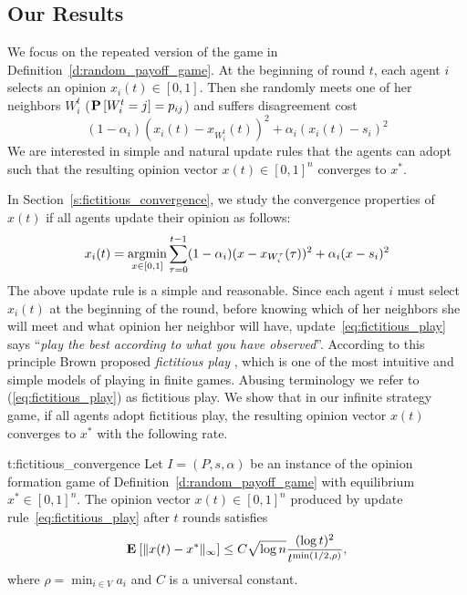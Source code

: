 \subsection{Our Results}

We focus on the repeated version of the game in 
Definition~\ref{d:random_payoff_game}. At the beginning 
of round $t$, each agent $i$ selects an opinion 
$x_i(t) \in [0,1]$. Then she randomly meets 
one of her neighbors $W_i^t$ ($\bm{\mathrm{P}}\left[W_i^t=j\right]=p_{ij}$)
and suffers disagreement cost
\[(1-\alpha_i)(x_i(t)-x_{W_i^t}(t))^2+\alpha_i(x_i(t)-s_i)^2 \] 
We are interested in simple and natural update rules
that the agents can adopt such that the resulting opinion
vector $x(t) \in [0,1]^n$ converges to $x^*$.

In Section~\ref{s:fictitious_convergence},
we study the convergence properties of $x(t)$ if all agents
update their opinion as follows:
\begin{equation}\label{eq:fictitious_play}
  x_i(t) =
  \operatorname*{argmin}_{x \in [0,1]}
  \sum_{\tau=0}^{t-1}(1-\alpha_i)(x-x_{W_i^\tau}(\tau))^2+\alpha_i(x-s_i)^2
\end{equation}
%
The above update rule is a simple and
reasonable. Since each agent $i$ must select $x_i(t)$ 
at the beginning of the round, before knowing 
which of her neighbors she will meet and 
what opinion her neighbor will have, 
update~\ref{eq:fictitious_play} says
\enquote{\emph{play the best according to what you have observed}}.
According to this principle Brown proposed \emph{fictitious play} 
\cite{Bro51}, which is one of the most intuitive and simple 
models of playing in finite games. Abusing terminology 
we refer to (\ref{eq:fictitious_play}) as fictitious play. 
We show that in our infinite strategy game, if all agents
adopt fictitious play, the resulting opinion vector $x(t)$ converges to
$x^*$ with the following rate.
%
\begin{reptheorem}{t:fictitious_convergence}
  Let $I = (P,s, \alpha)$ be an instance of the opinion formation
  game of Definition~\ref{d:random_payoff_game} with equilibrium
  $x^* \in [0,1]^n$.  The opinion vector $x(t)\in[0,1]^n$ produced by
  update rule~\ref{eq:fictitious_play} after $t$ rounds satisfies
  \[
    \bm{\mathrm{E}}_{} \left[ \| x(t) - x^* \|_{\infty} \right] \leq
    C \sqrt{\log n}\frac{(\log t)^{2}}{t^{\min(1/2,\rho)}},
  \]
  where $\rho = \min_{i \in V} a_i$ and $C$ is a universal constant.
\end{reptheorem}

